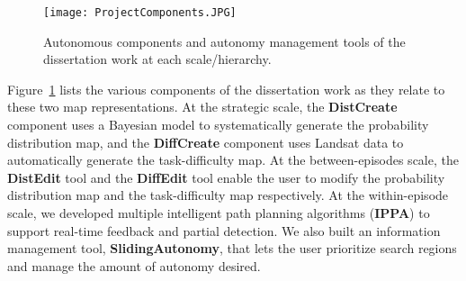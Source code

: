 
\begin{figure}
\centering
\texttt{[image: ProjectComponents.JPG]}
\caption{Autonomous components and autonomy management tools of the dissertation work at each scale/hierarchy.}
\label{ProjectComponents}
\end{figure}

Figure~\ref{ProjectComponents} lists the various components of the dissertation work as they relate to these two map representations. At the strategic scale, the \textbf{DistCreate} component uses a Bayesian model to systematically generate the probability distribution map, and the \textbf{DiffCreate} component uses Landsat data to automatically generate the task-difficulty map. At the between-episodes scale, the \textbf{DistEdit} tool and the \textbf{DiffEdit} tool enable the user to modify the probability distribution map and the task-difficulty map respectively. At the within-episode scale, we developed multiple intelligent path planning algorithms (\textbf{IPPA}) to support real-time feedback and partial detection. We also built an information management tool, \textbf{SlidingAutonomy}, that lets the user prioritize search regions and manage the amount of autonomy desired.

